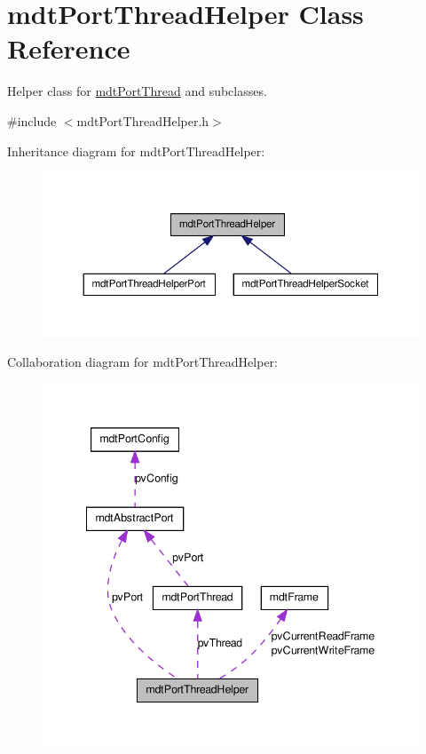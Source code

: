 \hypertarget{classmdt_port_thread_helper}{
\section{mdtPortThreadHelper Class Reference}
\label{classmdt_port_thread_helper}
}


Helper class for \hyperlink{classmdt_port_thread}{mdtPortThread} and subclasses.  




{\ttfamily \#include $<$mdtPortThreadHelper.h$>$}



Inheritance diagram for mdtPortThreadHelper:\nopagebreak
\begin{figure}[H]
\begin{center}
\leavevmode
\includegraphics[width=366pt]{classmdt_port_thread_helper__inherit__graph}
\end{center}
\end{figure}


Collaboration diagram for mdtPortThreadHelper:\nopagebreak
\begin{figure}[H]
\begin{center}
\leavevmode
\includegraphics[width=342pt]{classmdt_port_thread_helper__coll__graph}
\end{center}
\end{figure}
